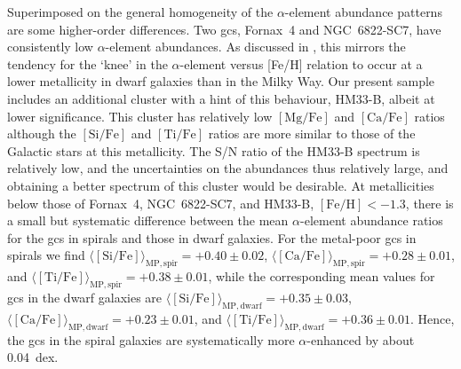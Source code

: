 \documentclass{aa}
\begin{document}
Superimposed on the general homogeneity of the $\alpha$-element abundance patterns are some higher-order differences. 
Two \acp{gc}, Fornax~4 and NGC~6822-SC7, have consistently low $\alpha$-element abundances. As discussed in \citet{Larsen2018}, this mirrors the tendency for the `knee' in the $\alpha$-element versus [Fe/H] relation to occur at a lower metallicity in dwarf galaxies than in the Milky Way. Our present sample includes an additional cluster with a hint of this behaviour, HM33-B, albeit at lower significance. This cluster has relatively low $\mathrm{[Mg/Fe]}$ and $\mathrm{[Ca/Fe]}$ ratios although the $\mathrm{[Si/Fe]}$ and $\mathrm{[Ti/Fe]}$ ratios are more similar to those of the Galactic stars at this metallicity. The S/N ratio of the HM33-B spectrum is relatively low, and the uncertainties on the abundances thus relatively large, and obtaining a better spectrum of this cluster would be desirable.
At metallicities below those of Fornax~4, NGC~6822-SC7, and HM33-B, $\mathrm{[Fe/H]}<-1.3$, there is a small but systematic difference between the mean $\alpha$-element abundance ratios for the \acp{gc} in spirals and those in dwarf galaxies. For the metal-poor \acp{gc} in spirals we find
$\langle \mathrm{[Si/Fe]}\rangle_\mathrm{MP,spir} = +0.40\pm0.02$, 
$\langle \mathrm{[Ca/Fe]}\rangle_\mathrm{MP,spir} = +0.28\pm0.01$, and
$\langle \mathrm{[Ti/Fe]}\rangle_\mathrm{MP,spir} = +0.38\pm0.01$,
while the corresponding mean values for \acp{gc} in the dwarf galaxies are
$\langle \mathrm{[Si/Fe]}\rangle_\mathrm{MP,dwarf} = +0.35\pm0.03$, 
$\langle \mathrm{[Ca/Fe]}\rangle_\mathrm{MP,dwarf} = +0.23\pm0.01$, and
$\langle \mathrm{[Ti/Fe]}\rangle_\mathrm{MP,dwarf} = +0.36\pm0.01$.
Hence, the \acp{gc} in the spiral galaxies are systematically more $\alpha$-enhanced by about 0.04~dex. 
\end{document}
